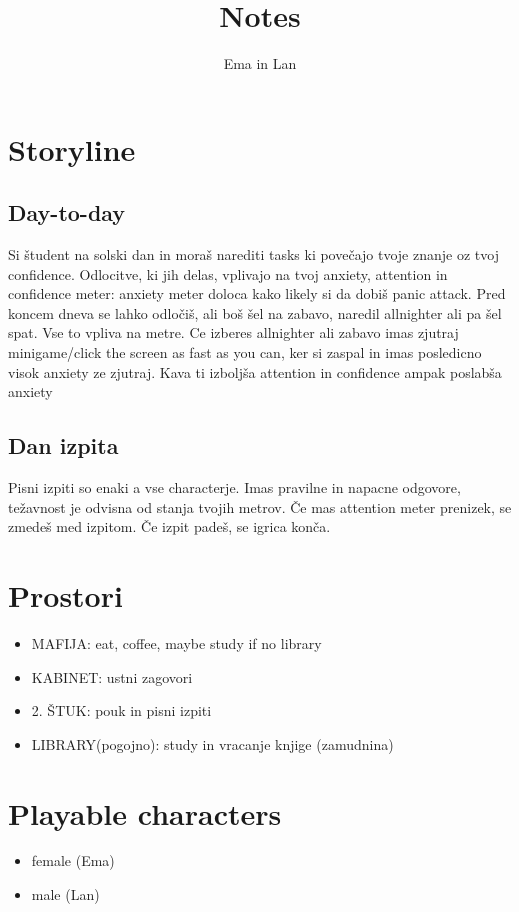 \documentclass[a4paper]{article}
\begin{document}
\title{Notes}
\author{Ema in Lan}
\date{}
\maketitle

\section{Storyline}
\subsection*{Day-to-day}
Si študent na solski dan in moraš narediti tasks ki povečajo tvoje znanje oz tvoj confidence.
Odlocitve, ki jih delas, vplivajo na tvoj anxiety, attention in confidence meter: anxiety meter doloca kako likely si da dobiš panic attack. Pred koncem dneva se lahko odločiš, ali boš šel na zabavo, naredil allnighter ali pa šel spat. Vse to vpliva na metre. Ce izberes allnighter ali zabavo imas zjutraj minigame/click the screen as fast as you can, ker si zaspal in imas posledicno visok anxiety ze zjutraj. Kava ti izboljša attention in confidence ampak poslabša anxiety

\subsection*{Dan izpita}
Pisni izpiti so enaki a vse characterje. Imas pravilne in napacne odgovore, težavnost je odvisna od stanja tvojih metrov.
Če mas attention meter prenizek, se zmedeš med izpitom.
Če izpit padeš, se igrica konča.

\section{Prostori}
\begin{itemize}
    \item MAFIJA: eat, coffee, maybe study if no library
    \item KABINET: ustni zagovori
    \item 2. ŠTUK: pouk in pisni izpiti
    \item LIBRARY(pogojno): study in vracanje knjige (zamudnina)
\end{itemize}

\section{Playable characters}
\begin{itemize}
    \item female (Ema)
    \item male (Lan)
\end{itemize}
\end{document}
